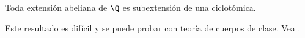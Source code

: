 \documentclass[11pt, reqno]{amsart}
\begin{document}
\begin{thm}
	Toda extensión abeliana de $\Q$ es subextensión de una ciclotómica.
\end{thm}
Este resultado es difícil y se puede probar con teoría de cuerpos de clase.
Vea \cite{neukirch:algebraic}.


\printbibliography
\end{document}
